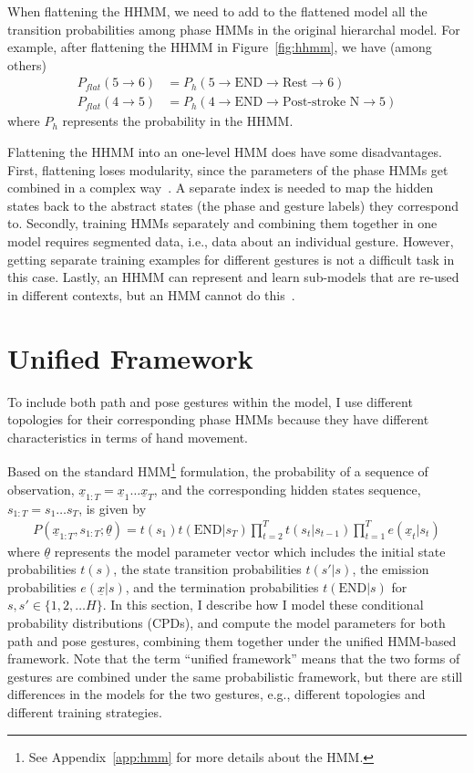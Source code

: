 When flattening the HHMM, we need to add to the flattened model all the
transition probabilities among phase HMMs in the original hierarchal model. For example,
after flattening the HHMM in Figure~\ref{fig:hhmm}, we have (among others)
\begin{align*}
P_{flat}(5\rightarrow6) &= P_h(5\rightarrow \text{END} \rightarrow \text{Rest}
\rightarrow 6 )\\
P_{flat}(4\rightarrow5) &= P_h(4\rightarrow \text{END} \rightarrow 
\text{Post-stroke N} \rightarrow 5)
\end{align*}
where $P_h$ represents the probability in the HHMM.

Flattening the HHMM into an one-level HMM does have some disadvantages. First,
flattening loses modularity, since the parameters of the phase HMMs get
combined in a complex way~\cite{murphy02}. A separate index is needed
to map the hidden states back to the abstract states (the phase and gesture
labels) they correspond to. Secondly, training HMMs separately and combining
them together in one model requires segmented data, i.e., data about an
individual gesture.
However, getting separate training examples for different gestures is not a difficult task in this case. Lastly, an HHMM can represent and learn sub-models that are re-used in different contexts, but an HMM cannot do this~\cite{murphy02}.

\section{Unified Framework}
To include both path and pose gestures within the model, I use different
topologies for their corresponding phase HMMs because
they have different characteristics in terms of hand movement.

Based on the standard HMM\footnote{See Appendix~\ref{app:hmm} for more details
about the HMM.} formulation, the probability of a sequence of observation,
$\underline{x}_{1:T} = \underline{x}_1\ldots\underline{x}_T$, and the corresponding hidden states sequence, $s_{1:T} = s_1\ldots s_T$, is given by
\begin{align}
P(\underline{x}_{1:T}, s_{1:T};\underline{\theta}) = 
    t(s_1)t(\text{END}|s_T)\prod_{t = 2}^T t(s_t | s_{t-1})\prod_{t = 1}^T
    e(\underline{x}_t|s_t)\label{eq:hmm}
\end{align}
where $\underline{\theta}$ represents the model parameter vector which includes
the initial state probabilities $t(s)$, the state transition probabilities $t(s'|s)$, the 
emission probabilities $e(\underline{x}|s)$,
and the termination probabilities $t(\text{END}|s)$ for $s, s'\in \{1, 2,\ldots
H\}$. In this section, I describe how I model these conditional
probability distributions (CPDs), and compute the model parameters for both
path and pose gestures, combining them together under the unified HMM-based
framework. Note that the term ``unified framework'' means that the two forms of
gestures are combined under the same probabilistic framework, but there are
still differences in the models for the two gestures, e.g., different topologies
and different training strategies.

